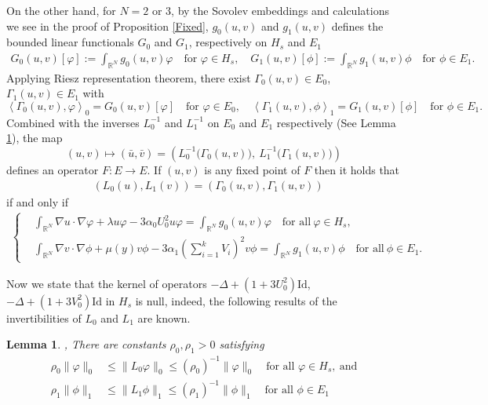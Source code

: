 \documentclass{amsart}
\newtheorem{lemma}[theorem]{Lemma}
\theoremstyle{definition}
\theoremstyle{remark}
\numberwithin{equation}{section}
\begin{document}
On the other hand, for $N=2$ or $3$, by the Sovolev embeddings and calculations we see in the proof of Proposition \ref{Fixed}, $g_0(u,v)$ and $g_1(u,v)$ {defines the bounded linear functionals {$G_0$ and $G_1$,} respectively on $H_s$ and $E_1$} 
\begin{align*}
 G_0(u,v)[\varphi]:=\int_{ \mathbb{R}^N} g_0(u,v)\varphi \quad \text{for $\varphi \in H_s$}, \quad
 G_1(u,v)[\phi]:=\int_{ \mathbb{R}^N} g_1(u,v)\phi \quad \text{for $\phi \in E_1$}.
\end{align*}
Applying Riesz representation theorem, there exist $\Gamma_0(u,v) \in E_0$, $\Gamma_1(u,v) \in E_1$ with
$$\left<\Gamma_0(u,v),\varphi\right>_0 = G_0(u,v)[\varphi] \quad \text{for $\varphi \in E_0$}, \quad \left<\Gamma_1(u,v),\phi\right>_1 = G_1(u,v)[\phi] \quad \text{for $\phi \in E_1$}.$$
Combined with the inverses $L_0^{-1}$ and $L_1^{-1}$ on $E_0$ and $E_1$ respectively (See Lemma \ref{inv0}), the map
$$(u,v) \mapsto (\bar{u},\bar{v})=\left(L_0^{-1}\Big(\Gamma_0(u,v)\Big), ~L_1^{-1}\Big(\Gamma_1(u,v)\Big)\right)$$
defines an operator $F: E \rightarrow E$. If $(u,v)$ is any fixed point of $F$ then it holds that
\begin{align*}
 &\left(L_0(u),L_1(v)\right) = \left(\Gamma_0(u,v),\Gamma_1(u,v)\right)\end{align*}
 if and only if 
 \begin{align*}
 \left\{ 
 \begin{aligned}
  &\int_{\mathbb{R}^N} \nabla u \cdot \nabla \varphi + \lambda u\varphi - 3\alpha_0U_0^2 u\varphi = \int_{\mathbb{R}^N} g_0(u,v)\varphi \quad\mbox{for all}\  \varphi\in H_s,\\
  &\int_{\mathbb{R}^N} \nabla v \cdot \nabla \phi + \mu(y) v\phi - 3\alpha_1\left(\sum_{i=1}^k V_{i}\right)^2v\phi = \int_{\mathbb{R}^N} g_1(u,v)\phi \quad \mbox{for all}\ \phi \in E_1.
 \end{aligned}
 \right.
\end{align*}

Now we state that the kernel of operators $-\Delta +(1+3U_0^2)\textrm{Id}$,  $-\Delta +(1+3V_0^2)\textrm{Id}$ in $H_s$ is null, indeed,  the following results of the invertibilities of $L_0$ and $L_1$  are known.
\begin{lemma} \cite{Kwong},  \cite[Lemma 2.1]{wei_yan_2014}  \label{inv0} There are constants $\rho_0, \rho_1>0$ satisfying
\begin{align*}
\rho_0 \|\varphi\|_0 &\le  \|L_0 \varphi\|_0  \le (\rho_0)^{-1}\|\varphi\|_0  \quad \text{for all $\varphi \in H_s$},\ \mbox{and} \\
\rho_1 \|\phi\|_1 &\le  \|L_1 \phi\|_1 \le (\rho_1)^{-1}\|\phi\|_1 \quad \text{for all $\phi \in E_1$}
\end{align*}
\end{lemma}
\end{document}

